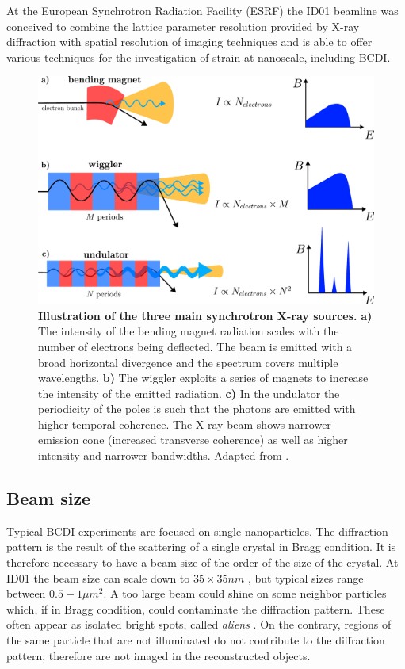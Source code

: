 At the European Synchrotron Radiation Facility (ESRF) the ID01 beamline was conceived to combine the lattice parameter 
resolution provided by X-ray diffraction with spatial resolution of imaging techniques \cite{leake_nanodiffraction_2019} and 
is able to offer various techniques for the investigation of strain at nanoscale, including BCDI. 

\begin{figure}[H]
    \centering
    \includegraphics[width=\textwidth]{figures/Intro/synchrotron.pdf}
    \caption{\textbf{Illustration of the three main synchrotron X-ray sources.} \textbf{a)} The intensity of the 
    bending magnet radiation scales with the number of electrons being deflected. The beam is emitted with a broad 
    horizontal divergence and the spectrum covers multiple wavelengths. \textbf{b)} The wiggler exploits a series of 
    magnets to increase the intensity of the emitted radiation. \textbf{c)} In the undulator the periodicity of the poles 
    is such that the photons are emitted with higher temporal coherence. The X-ray beam shows narrower emission cone (increased 
    transverse coherence) as well as higher intensity and narrower bandwidths. Adapted from \cite{undulators}.}
    \label{fig:synchrotron}
\end{figure}

\subsection{Beam size}

Typical BCDI experiments are focused on single nanoparticles. The diffraction pattern is the result of the scattering of 
a single crystal in Bragg condition. It is therefore necessary to have a beam size of the order of the size of the crystal. 
At ID01 the beam size can scale down to $35 \times 35 nm$ \cite{esrf_id01}, but typical sizes range between $0.5 - 1 \mu m^2$. 
A too large beam could shine on some neighbor particles which, if in Bragg condition, could contaminate the diffraction pattern. 
These often appear as isolated bright spots, called \textit{aliens} \cite{Pelzer:te5062}. On the contrary, regions of the same particle that 
are not illuminated do not contribute to the diffraction pattern, therefore are not imaged in the reconstructed objects. 

